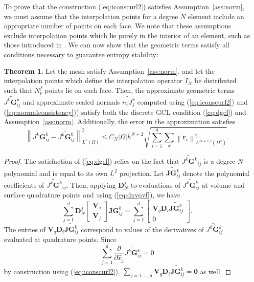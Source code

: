 \documentclass[preprint,10pt]{article}
\theoremstyle{definition}
\theoremstyle{lemma}
\theoremstyle{theorem}
\newtheorem{theorem}{Theorem}
\theoremstyle{assumption}
\renewcommand{\hat}{\widehat}
\renewcommand{\tilde}{\widetilde}
\newcommand{\pd}[2]{\frac{\partial#1}{\partial#2}}
\newcommand{\nor}[1]{\left\| #1 \right\|}
\newcommand{\LRp}[1]{\left( #1 \right)}
\newcommand{\LRs}[1]{\left[ #1 \right]}
\newcommand{\LRb}[1]{\left| #1 \right|}
\begin{document}
{To prove that the construction (\ref{eq:iconscurl2}) satisfies Assumption~\ref{ass:norm}, we must assume that the interpolation points for a degree $N$ element include an appropriate number of points on each face.  We note that these assumptions exclude interpolation points which lie purely in the interior of an element, such as those introduced in \cite{williams2014symmetric,witherden2015identification}.  We can now show that the geometric terms satisfy all conditions necessary to guarantee entropy stability:
\begin{theorem}
Let the mesh satisfy Assumption~\ref{ass:norm}, and let the interpolation points which define the interpolation operator $I_N$ be distributed such that $N^f_p$ points lie on each face. Then, the approximate geometric terms $\tilde{J^k\bm{G}^k_{ij}}$  and approximate scaled normals $\tilde{n_iJ^k_f}$ computed using (\ref{eq:iconscurl2}) and (\ref{eq:normalconsistency})) satisfy both the discrete GCL condition (\ref{eq:dgcl}) and Assumption~\ref{ass:norm}.  Additionally, the error in the approximation satisfies
\[
\nor{{J^k\bm{G}^k_{ij}}-\tilde{J^k\bm{G}^k_{ij}}}_{L^2\LRp{\Omega}}^2  \leq C_N \LRb{\Omega} h^{N+2} \sqrt{\sum_{i=1}^d \sum_k \nor{\bm{r}_i}^2_{W^{N+2,2}\LRp{D^k}}}.
\]
\label{thm:koprivagcl}
\end{theorem}
\begin{proof}
The satisfaction of (\ref{eq:dgcl}) relies on the fact that $\tilde{J^k\bm{G}^k}_{ij}$ is a degree $N$ polynomial and is equal to its own $L^2$ projection.  Let $\tilde{\bm{JG}^k_{ij}}$ denote the polynomial coefficients of $\tilde{J^k\bm{G}^k}_{ij}$.  
Then, applying $\bm{D}^j_N$ to evaluations of $\tilde{J^k\bm{G}^k_{ij}}$ at volume and surface quadrature points and using (\ref{eq:dnvqvf}), we have
\[
\sum_{j=1}^d\bm{D}^j_N \LRs{
\begin{array}{c}
\bm{V}_q\\
\bm{V}_f
\end{array}}
\tilde{\bm{JG}^k_{ij}} = 
\sum_{j=1}^d \LRs{\begin{array}{c}
\bm{V}_q\bm{D}_i\tilde{\bm{JG}^k_{ij}} \\
0
\end{array}}.
\]
The entries of $\bm{V}_q\bm{D}_i\tilde{\bm{JG}^k_{ij}}$ correspond to values of the derivatives of $\tilde{J^k\bm{G}^k_{ij}}$ evaluated at quadrature points.  Since 
\[
\sum_{j=1}^d\pd{}{\hat{x}_j}\tilde{J^k\bm{G}^k_{ij}} = 0
\]
by construction using (\ref{eq:iconscurl2}), $\sum_{j=1,\ldots,d} \bm{V}_q\bm{D}_i\tilde{\bm{JG}^k_{ij}} = \bm{0}$ as well.  


\end{proof}}
\end{document}
